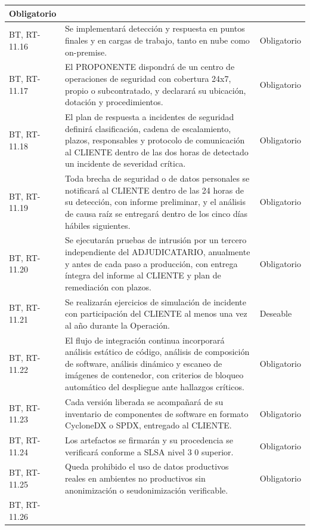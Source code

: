 \begin{longtable}{|L{0.098425\AnchoTablaAnexo}|L{0.814961\AnchoTablaAnexo}|L{0.086614\AnchoTablaAnexo}|}
Obligatorio \\ \hline
BT, RT-11.16 &
Se implementará detección y respuesta en puntos finales y en cargas de trabajo, tanto en nube como on-premise. &
Obligatorio \\ \hline
{}
BT, RT-11.17 &
El PROPONENTE dispondrá de un centro de operaciones de seguridad con cobertura 24x7, propio o subcontratado, y declarará su ubicación, dotación y procedimientos. &
Obligatorio \\ \hline
BT, RT-11.18 &
El plan de respuesta a incidentes de seguridad definirá clasificación, cadena de escalamiento, plazos, responsables y protocolo de comunicación al CLIENTE dentro de las dos horas de detectado un incidente de severidad crítica. &
Obligatorio \\ \hline
{}
BT, RT-11.19 &
Toda brecha de seguridad o de datos personales se notificará al CLIENTE dentro de las 24 horas de su detección, con informe preliminar, y el análisis de causa raíz se entregará dentro de los cinco días hábiles siguientes. &
Obligatorio \\ \hline
BT, RT-11.20 &
Se ejecutarán pruebas de intrusión por un tercero independiente del ADJUDICATARIO, anualmente y antes de cada paso a producción, con entrega íntegra del informe al CLIENTE y plan de remediación con plazos. &
Obligatorio \\ \hline
{}
BT, RT-11.21 &
Se realizarán ejercicios de simulación de incidente con participación del CLIENTE al menos una vez al año durante la Operación. &
Deseable \\ \hline
BT, RT-11.22 &
El flujo de integración continua incorporará análisis estático de código, análisis de composición de software, análisis dinámico y escaneo de imágenes de contenedor, con criterios de bloqueo automático del despliegue ante hallazgos críticos. &
Obligatorio \\ \hline
{}
BT, RT-11.23 &
Cada versión liberada se acompañará de su inventario de componentes de software en formato CycloneDX o SPDX, entregado al CLIENTE. &
Obligatorio \\ \hline
BT, RT-11.24 &
Los artefactos se firmarán y su procedencia se verificará conforme a SLSA nivel 3 0 superior. &
Obligatorio \\ \hline
{}
BT, RT-11.25 &
Queda prohibido el uso de datos productivos reales en ambientes no productivos sin anonimización o seudonimización verificable. &
Obligatorio \\ \hline
BT, RT-11.26 &

\end{longtable}
